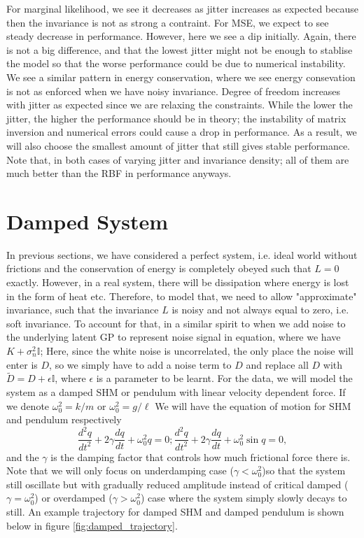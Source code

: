 \documentclass{statsmsc}
\begin{document}
For marginal likelihood, we see it decreases as jitter increases as expected because then the invariance is not as strong a contraint.
For MSE, we expect to see steady decrease in performance.
However, here we see a dip initially.
Again, there is not a big difference, and that the lowest jitter might not be enough to stablise the model so that the worse performance could be due to numerical instability.
We see a similar pattern in energy conservation, where we see energy consevation is not as enforced when we have noisy invariance.
Degree of freedom increases with jitter as expected since we are relaxing the constraints.
While the lower the jitter, the higher the performance should be in theory; the instability of matrix inversion and numerical errors could cause a drop in performance.
As a result,  we will also choose the smallest amount of jitter that still gives stable performance.  
Note that, in both cases of varying jitter and invariance density; all of them are much better than the RBF in performance anyways.

\section{Damped System}
In previous sections, we have considered a perfect system, i.e. ideal world without frictions and the conservation of energy is completely obeyed such that $L=0$ exactly.
However, in a real system, there will be dissipation where energy is lost in the form of heat etc.  
Therefore, to model that, we need to allow "approximate" invariance, such that the invariance $L$ is noisy and not always equal to zero, i.e. soft invariance.
To account for that, in a similar spirit to when we add noise to the underlying latent GP to represent noise signal in equation, where we have $K+\sigma_n^2 \mathbb{I}$;
Here, since the white noise is uncorrelated, the only place the noise will enter is $D$, so we simply have to add a noise term to $D$ and replace all $D$ with $\tilde{D}=D+\epsilon \mathbb{I}$, where $\epsilon$ is a parameter to be learnt. 
For the data, we will model the system as a damped SHM or pendulum with linear velocity dependent force.
If we denote $\omega_0^2=k/m$ or $\omega_0^2=g/\ell$
We will have the equation of motion for SHM and pendulum respectively
$$
\frac{d^2q}{dt^2}+2\gamma\frac{dq}{dt}+\omega_0^2q=0; \frac{d^2q}{dt^2}+2\gamma\frac{dq}{dt}+\omega_0^2\sin q=0 ,
$$
and the $\gamma$ is the damping factor that controls how much frictional force there is. 
Note that we will only focus on underdamping case ($\gamma < \omega_0^2$)so that the system still oscillate but with gradually reduced amplitude instead of critical damped ($\gamma=\omega_0^2$) or overdamped ($\gamma>\omega_0^2$) case where the system simply slowly decays to still.
An example trajectory for damped SHM and damped pendulum is shown below in figure \ref{fig:damped_trajectory}.
\end{document}
